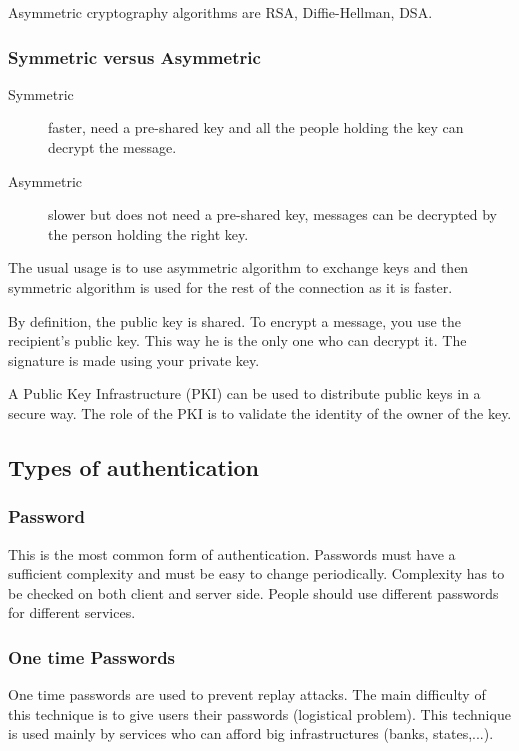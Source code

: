 Asymmetric cryptography algorithms are RSA, Diffie-Hellman, DSA.

\subsubsection{Symmetric versus Asymmetric}

\begin{description}
\item[Symmetric]
faster, need a pre-shared key and all the people holding the key can
decrypt the message.
\item[Asymmetric]
slower but does not need a pre-shared key, messages can be decrypted by the
person holding the right key.
\end{description}

The usual usage is to use asymmetric algorithm to exchange keys and then
symmetric algorithm is used for the rest of the connection as it is faster.

By definition, the public key is shared.
To encrypt a message, you use the recipient's public key. This way he is the
only one who can decrypt it. The signature is made using your private key.

A Public Key Infrastructure (PKI) can be used to distribute public keys in a
secure way. The role of the PKI is to validate the identity of the owner of
the key.

\subsection{Types of authentication}

\subsubsection{Password}
This is the most common form of authentication.
Passwords must have a sufficient complexity and must be easy to change
periodically.
Complexity has to be checked on both client and server side.
People should use different passwords for different services.

\subsubsection{One time Passwords}
One time passwords are used to prevent replay attacks.
The main difficulty of this technique is to give users their passwords
(logistical problem).
This technique is used mainly by services who can afford big infrastructures
(banks, states,...).

